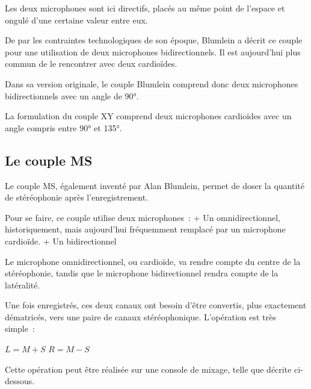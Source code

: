 \documentclass[
]{book}
\begin{document}
Les deux microphones sont ici directifs, placés au même point de l'espace et ongulé d'une certaine valeur entre eux.

De par les contraintes technologiques de son époque, Blumlein a décrit ce couple pour une utilisation de deux microphones bidirectionnels. Il est aujourd'hui plus commun de le rencontrer avec deux cardioïdes.

Dans sa version originale, le couple Blumlein comprend donc deux microphones bidirectionnels avec un angle de 90°.

La formulation du couple XY comprend deux microphones cardioïdes avec un angle compris entre 90° et 135°.

\hypertarget{le-couple-ms}{%
\subsection{Le couple MS}\label{le-couple-ms}}

Le couple MS, également inventé par Alan Blumlein, permet de doser la quantité de stéréophonie après l'enregistrement.

Pour se faire, ce couple utilise deux microphones~:
+ Un omnidirectionnel, historiquement, mais aujourd'hui fréquemment remplacé par un microphone cardioïde.
+ Un bidirectionnel

Le microphone omnidirectionnel, ou cardioïde, va rendre compte du centre de la stéréophonie, tandis que le microphone bidirectionnel rendra compte de la latéralité.

Une fois enregistrés, ces deux canaux ont besoin d'être convertis, plus exactement dématricés, vers une paire de canaux stéréophonique. L'opération est très simple~:

\(L = M+S\)
\(R = M-S\)

Cette opération peut être réalisée sur une console de mixage, telle que décrite ci-dessous.
\end{document}
